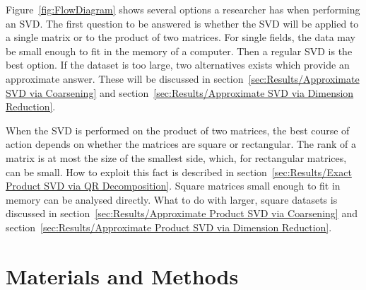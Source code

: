 \documentclass[ijgi,article,submit,moreauthors,pdftex,10pt,a4paper]{Definitions/mdpi}
\begin{document}
Figure~\ref{fig:FlowDiagram} shows several options a researcher has when performing an SVD. The first question to be answered is whether the SVD will be applied to a single matrix or to the product of two matrices. For single fields, the data may be small enough to fit in the memory of a computer. Then a regular SVD is the best option. If the dataset is too large, two alternatives exists which provide an approximate answer. These will be discussed in section~\ref{sec:Results/Approximate SVD via Coarsening} and section~\ref{sec:Results/Approximate SVD via Dimension Reduction}.

When the SVD is performed on the product of two matrices, the best course of action depends on whether the matrices are square or rectangular. The rank of a matrix is at most the size of the smallest side, which, for rectangular matrices, can be small. How to exploit this fact is described in section~\ref{sec:Results/Exact Product SVD via QR Decomposition}. Square matrices small enough to fit in memory can be analysed directly. What to do with larger, square datasets is discussed in section~\ref{sec:Results/Approximate Product SVD via Coarsening} and section~\ref{sec:Results/Approximate Product SVD via Dimension Reduction}.

\section{Materials and Methods}
\label{sec:Materials and Methods}


\end{document}
